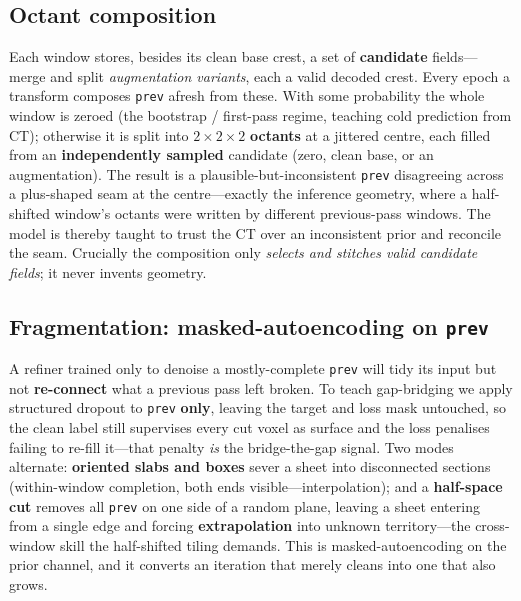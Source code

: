 \documentclass[10pt,twocolumn,a4paper]{article}
\newcommand{\code}[1]{\texttt{#1}}
\begin{document}
\subsection{Octant composition}
Each window stores, besides its clean base crest, a set of \textbf{candidate}
fields---merge and split \emph{augmentation variants}, each a valid decoded crest.
Every epoch a transform composes \code{prev} afresh from these. With some
probability the whole window is zeroed (the bootstrap / first-pass regime, teaching
cold prediction from CT); otherwise it is split into $2\times2\times2$
\textbf{octants} at a jittered centre, each filled from an \textbf{independently
sampled} candidate (zero, clean base, or an augmentation). The result is a
plausible-but-inconsistent \code{prev} disagreeing across a plus-shaped seam at the
centre---exactly the inference geometry, where a half-shifted window's octants were
written by different previous-pass windows. The model is thereby taught to trust
the CT over an inconsistent prior and reconcile the seam. Crucially the composition
only \emph{selects and stitches valid candidate fields}; it never invents geometry.

\subsection{Fragmentation: masked-autoencoding on \code{prev}}
A refiner trained only to denoise a mostly-complete \code{prev} will tidy its input
but not \textbf{re-connect} what a previous pass left broken. To teach
gap-bridging we apply structured dropout to \code{prev} \textbf{only}, leaving the
target and loss mask untouched, so the clean label still supervises every cut voxel
as surface and the loss penalises failing to re-fill it---that penalty \emph{is}
the bridge-the-gap signal. Two modes alternate: \textbf{oriented slabs and boxes}
sever a sheet into disconnected sections (within-window completion, both ends
visible---interpolation); and a \textbf{half-space cut} removes all \code{prev} on
one side of a random plane, leaving a sheet entering from a single edge and forcing
\textbf{extrapolation} into unknown territory---the cross-window skill the
half-shifted tiling demands. This is masked-autoencoding on the prior channel, and
it converts an iteration that merely cleans into one that also grows.
\end{document}
